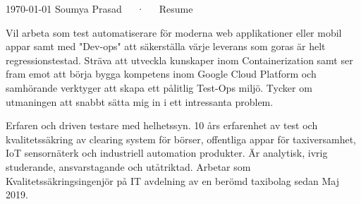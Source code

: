 \documentclass[12pt, a4paper]{awesome-cv}
\begin{document}
\makecvheader

\makecvfooter
  {\today}
  {Soumya Prasad~~~·~~~Resume}
  {\thepage}

\begin{cvparagraph}

    Vil arbeta som test automatiserare för moderna web applikationer eller mobil appar samt med "Dev-ops" att säkerställa
    värje leverans som goras är helt regressionstestad. Sträva att utveckla kunskaper inom Containerization samt ser fram 
    emot att börja bygga kompetens inom Google Cloud Platform och samhörande verktyger att skapa ett pålitlig Test-Ops miljö. 
    Tycker om utmaningen att snabbt sätta mig in i ett intressanta problem.
\end{cvparagraph}

\begin{cvparagraph}

    Erfaren och driven testare med helhetssyn. 10 års erfarenhet av test och kvalitetssäkring av 
    clearing system för börser, offentliga appar för taxiversamhet, IoT sensornäterk och industriell automation produkter.
    Är analytisk, ivrig studerande, ansvarstagande och utåtriktad. 
    Arbetar som Kvalitetssäkringsingenjör på IT avdelning av en berömd taxibolag sedan Maj 2019. 
\end{cvparagraph}
\end{document}

